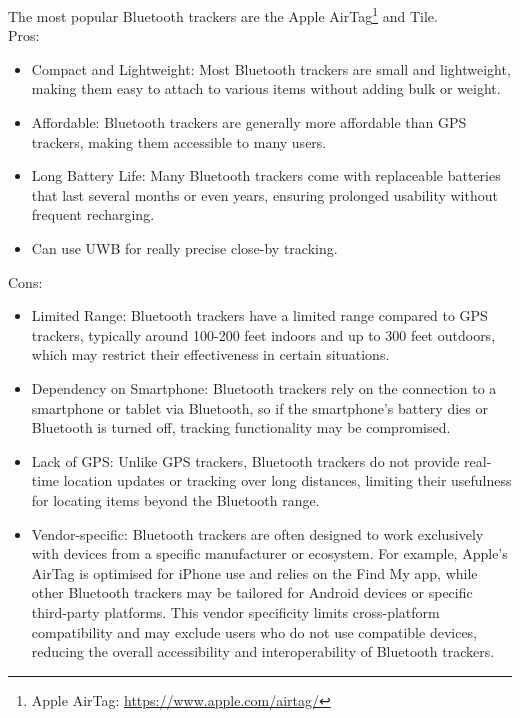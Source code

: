 The most popular Bluetooth trackers are the Apple AirTag\footnote{Apple AirTag: \url{https://www.apple.com/airtag/}} and Tile.\\
Pros:
\begin{itemize}
  \item Compact and Lightweight: Most Bluetooth trackers are small and lightweight, making them easy to attach to various items without adding bulk or weight.
  \item Affordable: Bluetooth trackers are generally more affordable than \ac{GPS} trackers, making them accessible to many users.
  \item Long Battery Life: Many Bluetooth trackers come with replaceable batteries that last several months or even years, ensuring prolonged usability without frequent recharging.
  \item Can use \ac{UWB} for really precise close-by tracking.
\end{itemize}

Cons:
\begin{itemize}
  \item Limited Range: Bluetooth trackers have a limited range compared to \ac{GPS} trackers, typically around 100-200 feet indoors and up to 300 feet outdoors, which may restrict their effectiveness in certain situations.
  \item Dependency on Smartphone: Bluetooth trackers rely on the connection to a smartphone or tablet via Bluetooth, so if the smartphone's battery dies or Bluetooth is turned off, tracking functionality may be compromised.
  \item Lack of \ac{GPS}: Unlike \ac{GPS} trackers, Bluetooth trackers do not provide real-time location updates or tracking over long distances, limiting their usefulness for locating items beyond the Bluetooth range.
  \item Vendor-specific: Bluetooth trackers are often designed to work exclusively with devices from a specific manufacturer or ecosystem. For example, Apple's AirTag is optimised for iPhone use and relies on the Find My app, while other Bluetooth trackers may be tailored for Android devices or specific third-party platforms. This vendor specificity limits cross-platform compatibility and may exclude users who do not use compatible devices, reducing the overall accessibility and interoperability of Bluetooth trackers.
\end{itemize}

